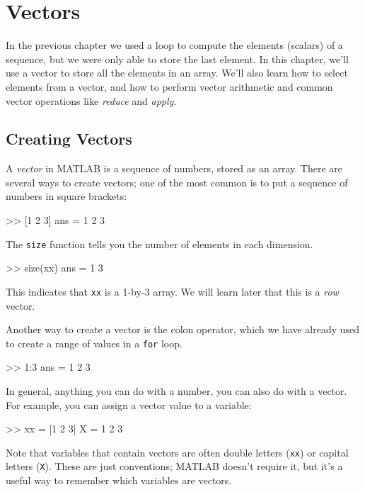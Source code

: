 \chapter{Vectors}
\label{vectors}

In the previous chapter we used a loop to compute the elements (scalars) of a sequence, but we were only able to store the last element.  In this chapter, we'll use a vector to store all the elements in an array.
We'll also learn how to select elements from a vector, and how to perform vector arithmetic and common vector operations like \emph{reduce} and \emph{apply}.

\section{Creating Vectors}


A \emph{vector} in MATLAB is a sequence of numbers, stored as an array.
There are several ways to create vectors; one of the most common is
to put a sequence of numbers in square brackets:

\begin{code}
>> [1 2 3]
ans = 1     2     3
\end{code}

The \lstinline{size} function tells you the number of elements in each dimension.

\begin{code}
>> size(xx)
ans =
    1     3
\end{code}
This indicates that \lstinline{xx} is a 1-by-3 array.  We will learn later that this is a \emph{row} vector.


Another way to create a vector is the colon operator, which we have already used to create a range of values in a \lstinline{for} loop.

\begin{code}
>> 1:3
ans = 1     2     3
\end{code}

In general, anything you can do with a number, you can also do with
a vector.  For example, you can assign a vector value to a variable:

\begin{code}
>> xx = [1 2 3]
X = 1     2     3
\end{code}

Note that variables that contain vectors are often double letters (\lstinline{xx}) or capital letters (\lstinline{X}).
These are just conventions; MATLAB doesn't require it, but it's a useful way to remember which variables are vectors.

